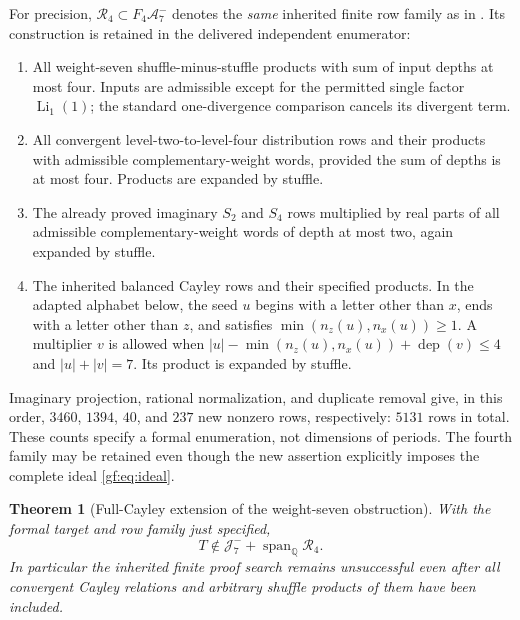 \documentclass[11pt,a4paper]{article}
\numberwithin{equation}{section}
\newtheorem{theorem}{Theorem}[section]
\theoremstyle{definition}
\theoremstyle{remark}
\begin{document}
For precision, $\mathscr R_4\subset F_4\mathcal A_7^-$ denotes the
\emph{same} inherited finite row family as in \cite{gf:Bounded}. Its
construction is retained in the delivered independent enumerator:
\begin{enumerate}
\item All weight-seven shuffle-minus-stuffle products with sum of input
      depths at most four. Inputs are admissible except for the permitted
      single factor $\operatorname{Li}_1(1)$; the standard one-divergence
      comparison cancels its divergent term.
\item All convergent level-two-to-level-four distribution rows and their
      products with admissible complementary-weight words, provided the
      sum of depths is at most four. Products are expanded by stuffle.
\item The already proved imaginary $S_2$ and $S_4$ rows multiplied by real
      parts of all admissible complementary-weight words of depth at most
      two, again expanded by stuffle.
\item The inherited balanced Cayley rows and their specified products.
      In the adapted alphabet below, the seed $u$ begins with a letter
      other than $x$, ends with a letter other than $z$, and satisfies
      $\min(n_z(u),n_x(u))\geq1$. A multiplier $v$ is allowed when
      $|u|-\min(n_z(u),n_x(u))+\operatorname{dep}(v)\leq4$ and
      $|u|+|v|=7$. Its product is expanded by stuffle.
\end{enumerate}
Imaginary projection, rational normalization, and duplicate removal give,
in this order, $3460$, $1394$, $40$, and $237$ new nonzero rows, respectively:
$5131$ rows in total. These counts specify a formal enumeration, not
dimensions of periods. The fourth family may be retained even though the
new assertion explicitly imposes the complete ideal \eqref{gf:eq:ideal}.

\begin{theorem}[Full-Cayley extension of the weight-seven obstruction]
\label{gf:thm:main}
With the formal target and row family just specified,
\begin{equation}
 \boxed{\qquad
 T\notin\mathcal J_7^-+\operatorname{span}_{\mathbb Q}\mathscr R_4.
 \qquad}
 \label{gf:eq:nonmembership}
\end{equation}
In particular the inherited finite proof search remains unsuccessful even
after \emph{all} convergent Cayley relations and arbitrary shuffle products
of them have been included.
\end{theorem}
\end{document}
